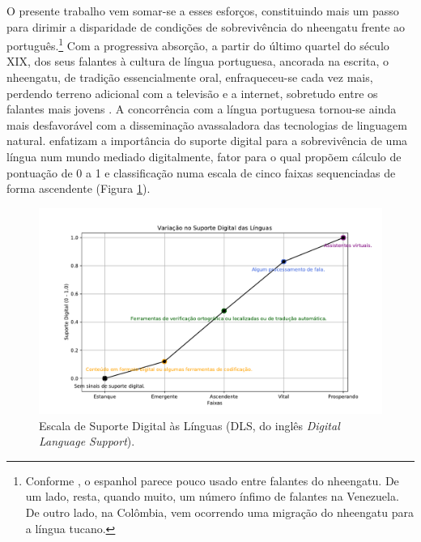 \documentclass[portuguese]{textolivre}
\begin{document}
O presente trabalho vem somar-se a esses esforços, constituindo mais um passo para dirimir a disparidade de condições de sobrevivência do nheengatu frente ao português.\footnote{Conforme \textcite{eberhard-simons-fennig2023}, o espanhol parece pouco usado entre falantes do nheengatu. De um lado, resta, quando muito, um número ínfimo de falantes na Venezuela. De outro lado, na Colômbia, vem ocorrendo uma migração do nheengatu para a língua tucano.} Com a progressiva absorção, a partir do último quartel do século XIX, dos seus falantes à cultura de língua portuguesa, ancorada na escrita, o nheengatu, de tradição essencialmente oral, enfraqueceu-se cada vez mais, perdendo terreno adicional com a televisão e a internet, sobretudo entre os falantes mais jovens \parencite{navarro-avila-trevisan-2017}. A concorrência com a língua portuguesa tornou-se ainda mais desfavorável com a disseminação avassaladora das tecnologias de linguagem natural. \textcite{simons-etal-2022-assessing-k} enfatizam a importância do suporte digital para a sobrevivência de uma língua num mundo mediado digitalmente, fator para o qual propõem cálculo de pontuação de 0 a 1 e classificação numa escala de cinco faixas sequenciadas de forma ascendente (Figura \ref{fig:digital-support}). 

\begin{figure}[htbp]
  \centering
  \begin{minipage}{.75\textwidth}
    \includegraphics[width=\linewidth]{figures/DigitalSupportColors.pdf}
    \caption{Escala de Suporte Digital às Línguas (DLS, do inglês \textit{Digital Language Support}).}
    \label{fig:digital-support}
  \end{minipage}
\end{figure}
 
\end{document}
